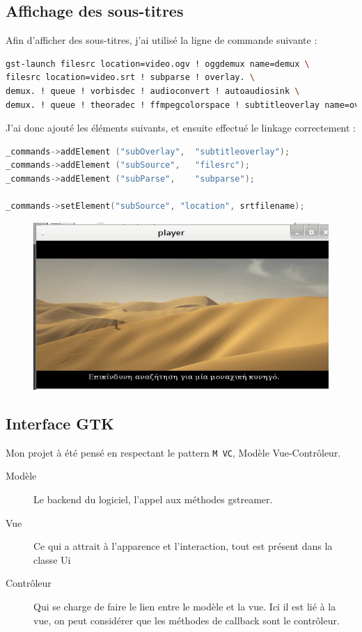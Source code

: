 \documentclass[a4paper, 11pt]{article}
\begin{document}
	\subsection{Affichage des sous-titres}
	Afin d'afficher des sous-titres, j'ai utilisé la ligne de commande suivante : 
	\begin{lstlisting}[language=sh]
gst-launch filesrc location=video.ogv ! oggdemux name=demux \
filesrc location=video.srt ! subparse ! overlay. \
demux. ! queue ! vorbisdec ! audioconvert ! autoaudiosink \
demux. ! queue ! theoradec ! ffmpegcolorspace ! subtitleoverlay name=overlay ! autovideosink;
	\end{lstlisting}

	J'ai donc ajouté les éléments suivants, et ensuite effectué le linkage correctement : 
	\begin{lstlisting}[language=C++]
_commands->addElement ("subOverlay",  "subtitleoverlay");
_commands->addElement ("subSource",   "filesrc");
_commands->addElement ("subParse",    "subparse");

_commands->setElement("subSource", "location", srtfilename);
	\end{lstlisting}

	\begin{figure}[H]
		\centering
		\includegraphics[width=13cm]{img/2.png}
	\end{figure}
	\subsection{Interface GTK}
	Mon projet à été pensé en respectant le pattern \texttt{M VC}, Modèle Vue-Contrôleur.

	\begin{description}
		\item[Modèle] Le backend du logiciel, l'appel aux méthodes gstreamer.
		\item[Vue] Ce qui a attrait à l'apparence et l'interaction, tout est présent dans la classe Ui
		\item[Contrôleur] Qui se charge de faire le lien entre le modèle et la vue. Ici il est lié à la vue, on peut considérer que les méthodes de callback sont
			le contrôleur.
	\end{description}
\end{document}
